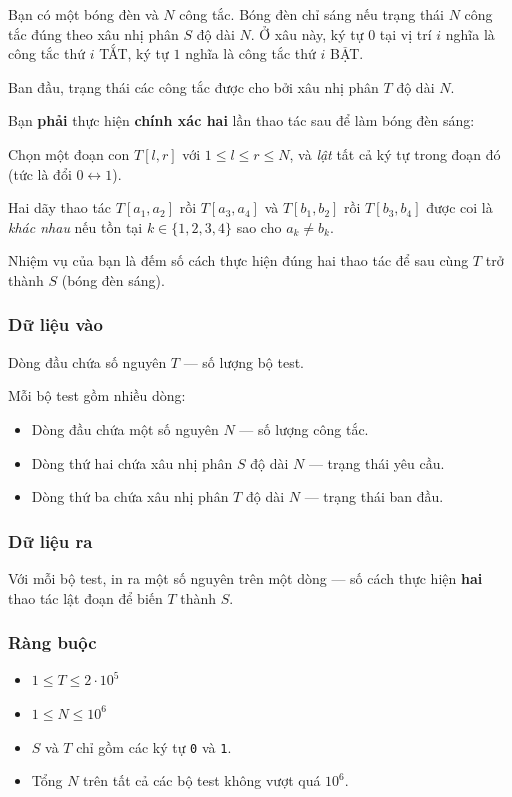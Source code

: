 Bạn có một bóng đèn và $N$ công tắc. Bóng đèn chỉ sáng nếu trạng thái $N$ công tắc đúng theo xâu nhị phân $S$ độ dài $N$. Ở xâu này, ký tự $0$ tại vị trí $i$ nghĩa là công tắc thứ $i$ TẮT, ký tự $1$ nghĩa là công tắc thứ $i$ BẬT.

Ban đầu, trạng thái các công tắc được cho bởi xâu nhị phân $T$ độ dài $N$.

Bạn \textbf{phải} thực hiện \textbf{chính xác hai} lần thao tác sau để làm bóng đèn sáng:

Chọn một đoạn con $T[l,r]$ với $1\le l\le r\le N$, và \emph{lật} tất cả ký tự trong đoạn đó (tức là đổi $0 \leftrightarrow 1$).

Hai dãy thao tác $T[a_1,a_2]$ rồi $T[a_3,a_4]$ và $T[b_1,b_2]$ rồi $T[b_3,b_4]$ được coi là \textit{khác nhau} nếu tồn tại $k\in\{1,2,3,4\}$ sao cho $a_k\ne b_k$.

Nhiệm vụ của bạn là đếm số cách thực hiện đúng hai thao tác để sau cùng $T$ trở thành $S$ (bóng đèn sáng).

\subsubsection*{Dữ liệu vào}
Dòng đầu chứa số nguyên $T$ — số lượng bộ test.  

Mỗi bộ test gồm nhiều dòng:
\begin{itemize}
  \item Dòng đầu chứa một số nguyên $N$ — số lượng công tắc.
  \item Dòng thứ hai chứa xâu nhị phân $S$ độ dài $N$ — trạng thái yêu cầu.
  \item Dòng thứ ba chứa xâu nhị phân $T$ độ dài $N$ — trạng thái ban đầu.
\end{itemize}

\subsubsection*{Dữ liệu ra}
Với mỗi bộ test, in ra một số nguyên trên một dòng — số cách thực hiện \textbf{hai} thao tác lật đoạn để biến $T$ thành $S$.

\subsubsection*{Ràng buộc}
\begin{itemize}
  \item $1 \le T \le 2\cdot 10^5$
  \item $1 \le N \le 10^6$
  \item $S$ và $T$ chỉ gồm các ký tự \texttt{0} và \texttt{1}.
  \item Tổng $N$ trên tất cả các bộ test không vượt quá $10^6$.
\end{itemize}


